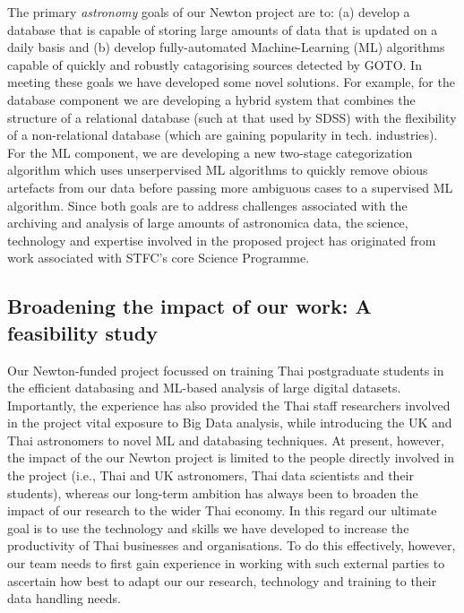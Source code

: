 \documentclass[11pt]{article}
\begin{document}
\vspace{2mm}
\noindent
The primary {\it astronomy} goals of our Newton project are to: (a) develop a database that is capable of storing large amounts of data that is updated on a daily basis and (b) develop fully-automated Machine-Learning (ML) algorithms capable of quickly and robustly catagorising sources detected by GOTO. In meeting these goals we have developed some novel solutions. For example, for the database component we are developing a hybrid system that combines the structure of a relational database (such at that used by SDSS) with the flexibility of a non-relational database (which are gaining popularity in tech. industries). For the ML component, we are developing a new two-stage categorization algorithm which uses unserpervised ML algorithms to quickly remove obious artefacts from our data before passing more ambiguous cases to a supervised ML algorithm. Since both goals are to address challenges associated with the archiving and analysis of large amounts of astronomica data, the science, technology and expertise involved in the proposed project has originated from work associated with STFC's core Science Programme. 

\subsection{Broadening the impact of our work: A feasibility study}
Our Newton-funded project focussed on training Thai postgraduate students in the efficient databasing and ML-based analysis of large digital datasets. Importantly, the experience has also provided the Thai staff researchers involved in the project vital exposure to Big Data analysis, while introducing the UK and Thai astronomers to novel ML and databasing techniques. At present, however, the impact of the our Newton project is limited to the people directly involved in the project (i.e., Thai and UK astronomers, Thai data scientists and their students), whereas our long-term ambition has always been to broaden the impact of our research to the wider Thai economy. In this regard our ultimate goal is to use the technology and skills we have developed to increase the productivity of Thai businesses and organisations. To do this effectively, however, our team needs to first gain experience in working with such external parties to ascertain how best to adapt our our research, technology and training to their data handling needs.  
\end{document}
